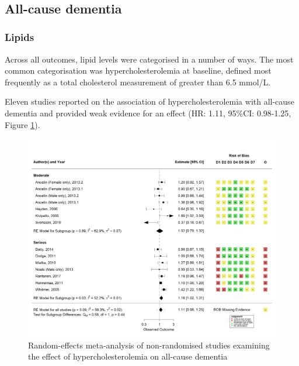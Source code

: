 \documentclass[a4paper, twoside]{templates/ociamthesis}
\begin{document}
~

\hypertarget{sys-rev-res-Dementia}{%
\subsection{All-cause dementia}\label{sys-rev-res-Dementia}}

\hypertarget{lipids}{%
\subsubsection{Lipids}\label{lipids}}

Across all outcomes, lipid levels were categorised in a number of ways. The most common categorisation was hypercholesterolemia at baseline, defined most frequently as a total cholesterol measurement of greater than 6.5 mmol/L.

Eleven studies reported on the association of hypercholesterolemia with all-cause dementia and provided weak evidence for an effect (HR: 1.11, 95\%CI: 0.98-1.25, Figure \ref{fig:obsHyperDementia}).





\begin{figure}[H]
\includegraphics[width=1\linewidth]{figures/sys-rev/fp_obs_hyperchol_Dementia} \caption[Meta-analysis of hypercholesterolemia on all-cause dementia]{Random-effects meta-analysis of non-randomised studies examining the effect of hypercholesterolemia on all-cause dementia}\label{fig:obsHyperDementia}
\end{figure}
\end{document}
